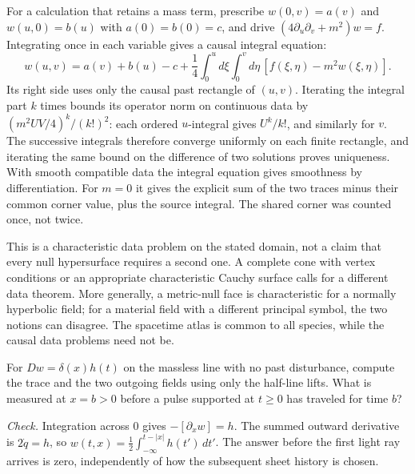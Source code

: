 For a calculation that retains a mass term, prescribe $w(0,v)=a(v)$ and $w(u,0)=b(u)$ with $a(0)=b(0)=c$, and drive $(4\partial_u\partial_v+m^2)w=f$. Integrating once in each variable gives a causal integral equation:
\begin{equation}
 w(u,v)=a(v)+b(u)-c+\frac14\int_0^u d\xi\int_0^v d\eta\,[f(\xi,\eta)-m^2 w(\xi,\eta)].\label{eq:double-null}
\end{equation}
Its right side uses only the causal past rectangle of $(u,v)$. Iterating the integral part $k$ times bounds its operator norm on continuous data by $(m^2UV/4)^k/(k!)^2$: each ordered $u$-integral gives $U^k/k!$, and similarly for $v$. The successive integrals therefore converge uniformly on each finite rectangle, and iterating the same bound on the difference of two solutions proves uniqueness. With smooth compatible data the integral equation gives smoothness by differentiation. For $m=0$ it gives the explicit sum of the two traces minus their common corner value, plus the source integral. The shared corner was counted once, not twice.

This is a characteristic data problem on the stated domain, not a claim that every null hypersurface requires a second one. A complete cone with vertex conditions or an appropriate characteristic Cauchy surface calls for a different data theorem. More generally, a metric-null face is characteristic for a normally hyperbolic field; for a material field with a different principal symbol, the two notions can disagree. The spacetime atlas is common to all species, while the causal data problems need not be.

\begin{exercise}\label{ex:sheetpulse}
For $Dw=\delta(x)h(t)$ on the massless line with no past disturbance, compute the trace and the two outgoing fields using only the half-line lifts. What is measured at $x=b>0$ before a pulse supported at $t\geq0$ has traveled for time $b$?
\end{exercise}
\noindent\emph{Check.} Integration across $0$ gives $-[\partial_x w]=h$. The summed outward derivative is $2\dot q=h$, so $w(t,x)=\tfrac12\int_{-\infty}^{t-|x|}h(t')\,dt'$. The answer before the first light ray arrives is zero, independently of how the subsequent sheet history is chosen.
